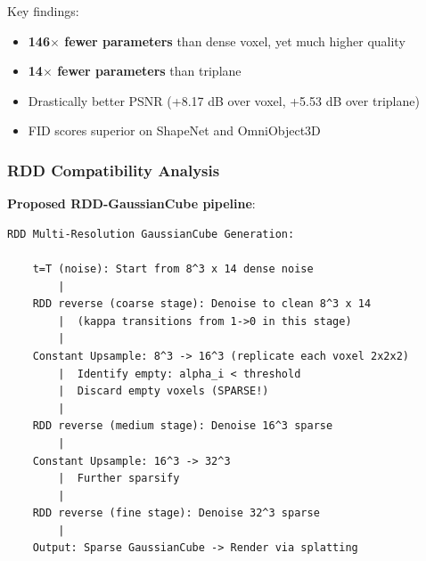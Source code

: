 \documentclass[11pt, a4paper]{article}
\begin{document}
Key findings:
\begin{itemize}
    \item \textbf{146$\times$ fewer parameters} than dense voxel, yet much higher quality
    \item \textbf{14$\times$ fewer parameters} than triplane
    \item Drastically better PSNR (+8.17 dB over voxel, +5.53 dB over triplane)
    \item FID scores superior on ShapeNet and OmniObject3D
\end{itemize}

\subsubsection{RDD Compatibility Analysis}

\begin{center}
\end{center}

\textbf{Proposed RDD-GaussianCube pipeline}:
\begin{lstlisting}[style=flowchart]
RDD Multi-Resolution GaussianCube Generation:

    t=T (noise): Start from 8^3 x 14 dense noise
        |
    RDD reverse (coarse stage): Denoise to clean 8^3 x 14
        |  (kappa transitions from 1->0 in this stage)
        |
    Constant Upsample: 8^3 -> 16^3 (replicate each voxel 2x2x2)
        |  Identify empty: alpha_i < threshold
        |  Discard empty voxels (SPARSE!)
        |
    RDD reverse (medium stage): Denoise 16^3 sparse
        |
    Constant Upsample: 16^3 -> 32^3
        |  Further sparsify
        |
    RDD reverse (fine stage): Denoise 32^3 sparse
        |
    Output: Sparse GaussianCube -> Render via splatting
\end{lstlisting}
\end{document}
